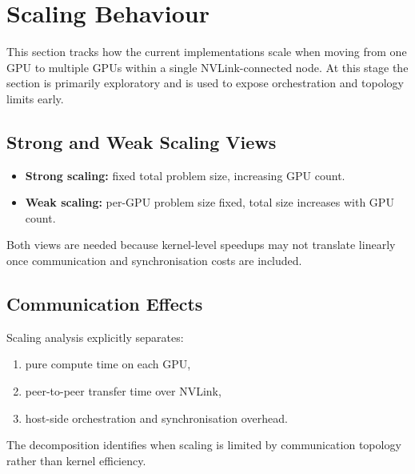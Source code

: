 \section{Scaling Behaviour}\label{sec:scaling}

This section tracks how the current implementations scale when moving from one
GPU to multiple GPUs within a single NVLink-connected node. At this stage the
section is primarily exploratory and is used to expose orchestration and
topology limits early.

\subsection{Strong and Weak Scaling Views}

\begin{itemize}
  \item \textbf{Strong scaling:} fixed total problem size, increasing GPU
    count.
  \item \textbf{Weak scaling:} per-GPU problem size fixed, total size increases
    with GPU count.
\end{itemize}

Both views are needed because kernel-level speedups may not translate linearly
once communication and synchronisation costs are included.

\subsection{Communication Effects}

Scaling analysis explicitly separates:

\begin{enumerate}
  \item pure compute time on each GPU,
  \item peer-to-peer transfer time over NVLink,
  \item host-side orchestration and synchronisation overhead.
\end{enumerate}

The decomposition identifies when scaling is limited by communication topology
rather than kernel efficiency.
